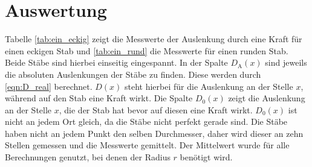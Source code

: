 \section{Auswertung}
\label{sec:Auswertung}
Tabelle \ref{tab:ein_eckig} zeigt die Messwerte der Auslenkung durch eine Kraft für einen eckigen Stab und \ref{tab:ein_rund} die Messwerte für einen runden Stab.
Beide Stäbe sind hierbei einseitig eingespannt.
In der Spalte $D_\text{A}(x)$ sind jeweils die absoluten Auslenkungen der Stäbe zu finden.
Diese werden durch \eqref{eqn:D_real} berechnet.
$D(x)$ steht hierbei für die Auslenkung an der Stelle $x$, während auf den Stab eine Kraft wirkt.
Die Spalte $D_0(x)$ zeigt die Auslenkung an der Stelle $x$, die der Stab hat bevor auf diesen eine Kraft wirkt.
$D_0(x)$ ist nicht an jedem Ort gleich, da die Stäbe nicht perfekt gerade sind.
Die Stäbe haben nicht an jedem Punkt den selben Durchmesser, daher wird dieser an zehn Stellen gemessen und die Messwerte gemittelt.
Der Mittelwert wurde für alle Berechnungen genutzt, bei denen der Radius $r$ benötigt wird.
